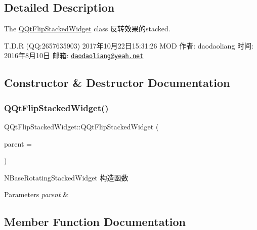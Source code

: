 \subsection{Detailed Description}
The \mbox{\hyperlink{class_q_qt_flip_stacked_widget}{Q\+Qt\+Flip\+Stacked\+Widget}} class 反转效果的stacked. 

T.\+D.\+R (QQ\+:2657635903) 2017年10月22日15\+:31\+:26 M\+OD 作者\+: daodaoliang 时间\+: 2016年8月10日 邮箱\+: \href{mailto:daodaoliang@yeah.net}{\tt daodaoliang@yeah.\+net} 

\subsection{Constructor \& Destructor Documentation}
\mbox{\label{class_q_qt_flip_stacked_widget_a8b3e87866ae036c3e9dbaaac1175254a}} 
\subsubsection{\texorpdfstring{Q\+Qt\+Flip\+Stacked\+Widget()}{QQtFlipStackedWidget()}}
{\footnotesize\ttfamily Q\+Qt\+Flip\+Stacked\+Widget\+::\+Q\+Qt\+Flip\+Stacked\+Widget (\begin{DoxyParamCaption}\item[{Q\+Widget $\ast$}]{parent = {} }\end{DoxyParamCaption})\hspace{0.3cm}{\ttfamily [explicit]}}



N\+Base\+Rotating\+Stacked\+Widget 构造函数 


\begin{DoxyParams}{Parameters}
{\em parent} & \\
\hline
\end{DoxyParams}


\subsection{Member Function Documentation}
\mbox{\label{class_q_qt_flip_stacked_widget_a44b52da1be95ffa6fbdeb7217fc6780b}} 

